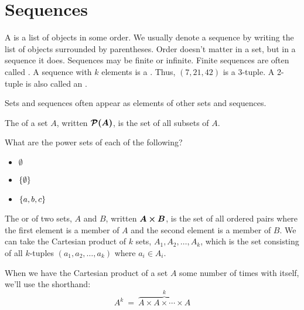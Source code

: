 
\section{Sequences}

\begin{defn}\label{defn:sequence}\label{defn:tuple}
A  is a list of objects in some order. We usually denote a sequence by writing the list of objects surrounded by parentheses. Order doesn't matter in a set, but in a sequence it does. Sequences may be finite or infinite. Finite sequences are often called . A sequence with $k$ elements is a . Thus, $(7, 21, 42)$ is a 3-tuple. A 2-tuple is also called an .
\end{defn}

\begin{discussion}
Sets and sequences often appear as elements of other sets and sequences. 
\end{discussion}

\begin{defn}
The  of a set $A$, written $\bm{\mathcal{P}(A)}$, is the set of all subsets of $A$.
\end{defn}

\begin{exer1}
What are the power sets of each of the following?
\begin{itemize}
\item $\emptyset$
\item $\left\lbrace \emptyset \right\rbrace$
\item $\left\lbrace a, b, c \right\rbrace$
\end{itemize}
\end{exer1}

\begin{defn}
The  or  of two sets, $A$ and $B$, written $\bm{A \times B}$, is the set of all ordered pairs where the first element is a member of $A$ and the second element is a member of $B$. We can take the Cartesian product of $k$ sets, $A_1, A_2, \ldots, A_k$, which is the set consisting of all $k$-tuples $(a_1, a_2, \ldots, a_k)$ where $a_i \in A_i$.

When we have the Cartesian product of a set $A$ some number of times with itself, we'll use the shorthand:
\[
A^k \ =\  \overbrace{A \times A \times \cdots \times A}^k
\]

\end{defn}

